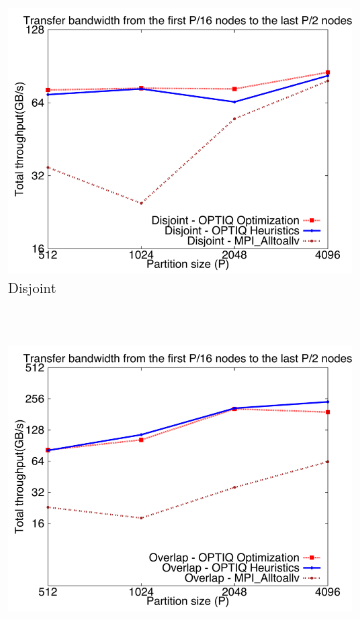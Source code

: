 \begin{figure}[!htbp]
        \centering
        \begin{subfigure}[b]{0.32\textwidth}
                \includegraphics[width=\textwidth]{figures/constantr_disjoint_msg.pdf}
                \caption{Disjoint}
                \label{fig:constantr_disjoint_msg}
        \end{subfigure}%
        ~ %
        \begin{subfigure}[b]{0.32\textwidth}
                \includegraphics[width=\textwidth]{figures/constantr_overlap_msg.pdf}

\end{subfigure}
\end{figure}
